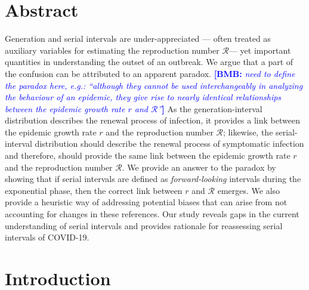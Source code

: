 \documentclass[12pt]{article}
\date{\today}
\newcommand{\comment}{\showcomment}
\newcommand{\showcomment}[3]{\textcolor{#1}{\textbf{[#2: }\textsl{#3}\textbf{]}}}
\newcommand{\bmb}[1]{\comment{blue}{BMB}{#1}}
\newcommand{\RR}{\ensuremath{{\mathcal R}}\xspace}
\begin{document}
\begin{flushleft}{
	\Large
	\textbf{}
}
\end{flushleft}

\section*{Abstract}

Generation and serial intervals are under-appreciated --- often treated as auxiliary variables for estimating the reproduction number \RR --- yet important quantities in understanding the outset of an outbreak.
We argue that a part of the confusion can be attributed to an apparent paradox.
\bmb{need to define the paradox here, e.g.: ``although they cannot be used interchangeably in analyzing the behaviour of an epidemic, they give rise to nearly identical relationships between the epidemic growth rate $r$ and \RR''}
As the generation-interval distribution describes the renewal process of infection, it provides a link between the epidemic growth rate $r$ and the reproduction number \RR;
likewise, the serial-interval distribution should describe the renewal process of symptomatic infection and therefore, should provide the same link between the epidemic growth rate $r$ and the reproduction number \RR.
We provide an answer to the paradox by showing that if serial intervals are defined as \emph{forward-looking} intervals during the exponential phase, then the correct link between $r$ and \RR emerges.
We also provide a heuristic way of addressing potential biases that can arise from not accounting for changes in these references.
Our study reveals gaps in the current understanding of serial intervals and provides rationale for reassessing serial intervals of COVID-19.

\pagebreak

\section{Introduction}
\end{document}
